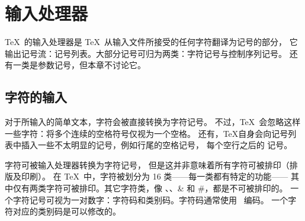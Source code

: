 \documentclass{book}
\begin{document}
\section{输入处理器}

\TeX\ 的输入处理器是 \TeX\ 从输入文件所接受的任何字符翻译为记号的部分，
它输出记号流：记号列表。大部分记号可归为两类：字符记号与控制序列记号。
还有一类是参数记号，但本章不讨论它。

\subsection{字符的输入}

对于所输入的简单文本，字符会被直接转换为字符记号。
不过，\TeX\ 会忽略这样一些字符：将多个连续的空格符号仅视为一个空格。
还有，\TeX 自身会向记号列表中插入一些不太明显的记号，例如行尾的空格记号，
每个空行之后的  记号。

字符可被输入处理器转换为字符记号，
但是这并非意味着所有字符可被排印（排版及印刷）。
在 \TeX\ 中，字符被划分为 16 类——每一类都有特定的功能——%
其中仅有两类字符可被排印。其它字符类，像 、、\n\&
和 \n\#，都是不可被排印的。
一个字符记号可视为一对数字：字符码和类别码。字符码通常使用 \ascii\ 编码。
一个字符对应的类别码是可以修改的。
\end{document}
